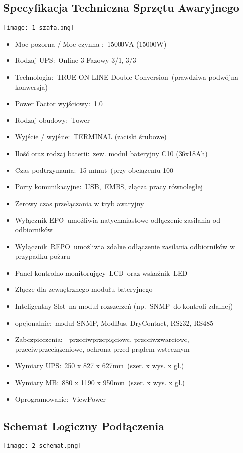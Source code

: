 \subsection{Specyfikacja Techniczna Sprzętu Awaryjnego}
\texttt{[image: 1-szafa.png]}
\begin{itemize}
    \item Moc pozorna / Moc czynna : 15000VA (15000W)
    \item Rodzaj UPS: Online 3-Fazowy 3/1, 3/3
    \item Technologia: TRUE ON-LINE Double Conversion (prawdziwa podwójna konwersja)
    \item Power Factor wyjściowy: 1.0
    \item Rodzaj obudowy: Tower
    \item Wyjście / wyjście: TERMINAL (zaciski śrubowe)
    \item Ilość oraz rodzaj baterii: zew. moduł bateryjny C10 (36x18Ah)
    \item Czas podtrzymania: 15 minut (przy obciążeniu 100%
    \item Porty komunikacyjne: USB, EMBS, złącza pracy równoległej
    \item Zerowy czas przełączania w tryb awaryjny
    \item Wyłącznik EPO umożliwia natychmiastowe odłączenie zasilania od odbiorników
    \item Wyłącznik REPO umożliwia zdalne odłączenie zasilania odbiorników w przypadku pożaru
    \item Panel kontrolno-monitorujący LCD oraz wskaźnik LED
    \item Złącze dla zewnętrznego modułu bateryjnego
    \item Inteligentny Slot na moduł rozszerzeń (np. SNMP do kontroli zdalnej)
    \item opcjonalnie: moduł SNMP, ModBus, DryContact, RS232, RS485
    \item Zabezpieczenia:  przeciwprzepięciowe, przeciwzwarciowe, przeciwprzeciążeniowe, ochrona przed prądem wstecznym
    \item Wymiary UPS: 250 x 827 x 627mm (szer. x wys. x gł.)
    \item Wymiary MB: 880 x 1190 x 950mm (szer. x wys. x gł.)
    \item Oprogramowanie: ViewPower
\end{itemize}


\subsection{Schemat Logiczny Podłączenia}
    \texttt{[image: 2-schemat.png]}

